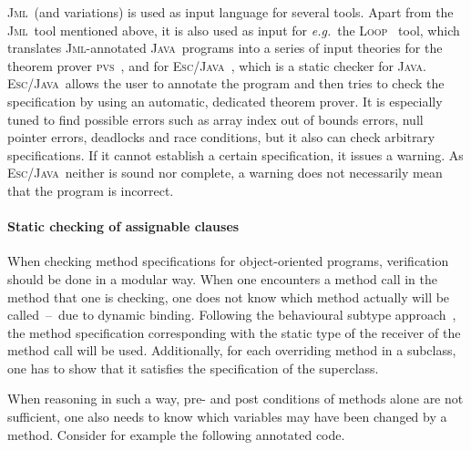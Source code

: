 \documentclass[a4paper]{llncs}
\newcommand{\jml}{\textsc{Jml}}
\newcommand{\escj}{\textsc{Esc/Java}}
\newcommand{\java}{\textsc{Java}}
\newcommand{\csrc}{\textsc{Compaq Src}}
\begin{document}

\jml\ (and variations) is used as input language for several
tools. Apart from the \jml\ tool mentioned above, it is also used as
input for \emph{e.g.}~the \textsc{Loop}~\cite{LoopURL} tool, which translates
\jml-annotated \java\ programs into a series of input theories for the 
theorem prover \textsc{pvs}~\cite{?}, and for \escj~\cite{ESCJavaUrl}, 
which is a static checker for \java. \escj\ allows the user to
annotate the program and then tries to check the specification by
using an automatic, dedicated theorem prover. It is especially tuned
to find possible errors such as array index out of bounds errors, null 
pointer errors, deadlocks and race conditions, but it also can check
arbitrary specifications. If it cannot establish a certain
specification, it issues a warning. As \escj\ neither is sound nor
complete, a warning does not necessarily mean that the program is incorrect.



\paragraph{\bf{Static checking of assignable clauses}}
When checking method specifications for object-oriented programs,
verification should be done in a modular way. When one encounters a
method call in the method that one is checking, one does not know
which method actually will be called~--~due to dynamic
binding. Following the behavioural subtype approach~\cite{LiskovW?},
the method specification corresponding with the static type of the
receiver of the method call will be used. Additionally, for each
overriding method in a subclass, one has to show that it satisfies the 
specification of the superclass. 

When reasoning in such a way, pre- and post conditions of methods alone 
are not sufficient, one also needs to know which variables may have
been changed by a method. Consider for example the following annotated 
code.

\end{document}

